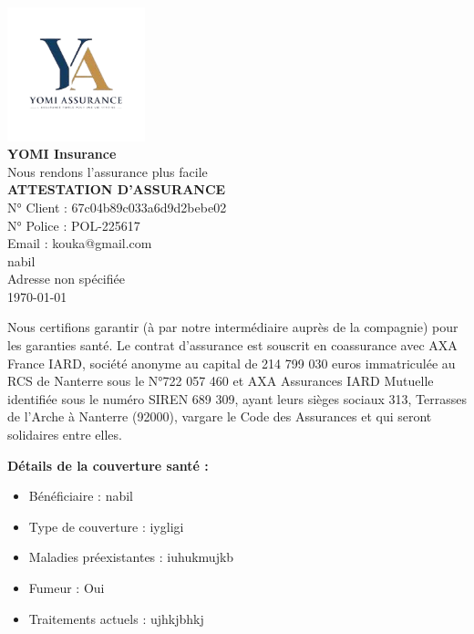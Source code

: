 \documentclass[a4paper]{article}
\begin{document}
\begin{center}
\includegraphics[width=0.3\textwidth]{../assets/logo.png} \\
{\Large \textbf{YOMI Insurance}} \\
{\small Nous rendons l'assurance plus facile} \\
\vspace{0.5cm}
{\Large \textbf{ATTESTATION D'ASSURANCE}} \\
\vspace{0.5cm}
N° Client : 67c04b89c033a6d9d2bebe02 \\
N° Police : POL-225617 \\
Email : kouka@gmail.com \\
nabil \\
Adresse non spécifiée \\
\vspace{0.5cm}
\today
\end{center}

\noindent Nous certifions garantir (à par notre intermédiaire auprès de la compagnie) pour les garanties santé. Le contrat d'assurance est souscrit en coassurance avec AXA France IARD, société anonyme au capital de 214 799 030 euros immatriculée au RCS de Nanterre sous le N°722 057 460 et AXA Assurances IARD Mutuelle identifiée sous le numéro SIREN 689 309, ayant leurs sièges sociaux 313, Terrasses de l'Arche à Nanterre (92000), vargare le Code des Assurances et qui seront solidaires entre elles.

\vspace{0.5cm}

      \textbf{Détails de la couverture santé :}
      \begin{itemize}
        \item Bénéficiaire : nabil
        \item Type de couverture : iygligi
        \item Maladies préexistantes : iuhukmujkb
        \item Fumeur : Oui
        \item Traitements actuels : ujhkjbhkj
      \end{itemize}
    
\end{document}
